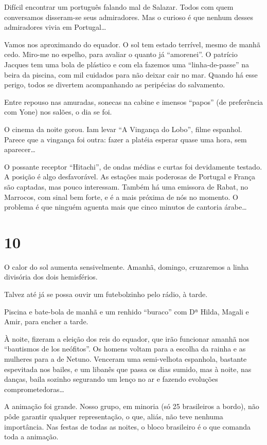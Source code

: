 Difícil encontrar um português falando mal de Salazar. Todos com quem conversamos disseram-se seus admiradores. Mas o curioso é que nenhum desses admiradores vivia em Portugal\ldots

Vamos nos aproximando do equador. O sol tem estado terrível, mesmo de manhã cedo. Miro-me no espelho, para avaliar o quanto já “amorenei”. O patrício Jacques tem uma bola de plástico e com ela fazemos uma “linha-de-passe” na beira da piscina, com mil cuidados para não deixar cair no mar. Quando há esse perigo, todos se divertem acompanhando as peripécias do salvamento.

Entre repouso nas amuradas, sonecas na cabine e imensos “papos” (de preferência com Yone) nos salões, o dia se foi.

O cinema da noite gorou. Iam levar “A Vingança do Lobo”, filme espanhol. Parece que a vingança foi outra: fazer a platéia esperar quase uma hora, sem aparecer\ldots

O possante receptor “Hitachi”, de ondas médias e curtas foi devidamente testado. A posição é algo desfavorável. As estações mais poderosas de Portugal e França são captadas, mas pouco interessam. Também há uma emissora de Rabat, no Marrocos, com sinal bem forte, e é a mais próxima de nós no momento. O problema é que ninguém aguenta mais que cinco minutos de cantoria árabe\ldots

\section*{10 \adfflatleafright {}}
O calor do sol aumenta sensivelmente. Amanhã, domingo, cruzaremos a linha divisória dos dois hemisférios.

Talvez até já se possa ouvir um futebolzinho pelo rádio, à tarde.

Piscina e bate-bola de manhã e um renhido “buraco” com Dª Hilda, Magali e Amir, para encher a tarde.

À noite, fizeram a eleição dos reis do equador, que irão funcionar amanhã nos “bautismos de los neófitos”. Os homens voltam para a escolha da rainha e as mulheres para a de Netuno. Venceram uma semi-velhota espanhola, bastante espevitada nos bailes, e um libanês que passa os dias sumido, mas à noite, nas danças, baila sozinho segurando um lenço no ar e fazendo evoluções comprometedoras\ldots

A animação foi grande. Nosso grupo, em minoria (só 25 brasileiros a bordo), não pôde garantir qualquer representação, o que, aliás, não teve nenhuma importância. Nas festas de todas as noites, o bloco brasileiro é o que comanda toda a animação.

